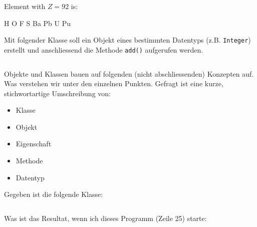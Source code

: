 \documentclass[12pt,a4paper]{exam}
\begin{document}
\begin{questions}
        {%
        \renewcommand*\thechoice{\arabic{choice}}
        \renewcommand*\choicelabel{\thechoice)}
        \question[2] Element with $Z=92$ is:
        \begin{multicols}{2}
            \begin{choices}
                \choice H
                \choice O
                \choice F
                \choice S
                \choice Ba
                \choice Pb
                \choice U
                \choice Pu
            \end{choices}
        \end{multicols}
        }%

        \question[10]
        Mit folgender Klasse soll ein Objekt eines bestimmten Datentyps (z.B.
        \texttt{Integer}) erstellt und anschliessend die Methode
        \texttt{add()} aufgerufen werden.
        \inputminted[autogobble,linenos,firstline=3]{java}{../java/generics/Cache.java}
        \makeemptybox{2in}

        \newpage
        \question[10]
        Objekte und Klassen bauen auf folgenden (nicht abschliessenden) Konzepten auf.
        Was verstehen wir unter den einzelnen Punkten. Gefragt ist eine kurze, stichwortartige
        Umschreibung von:
        \begin{itemize}
            \item Klasse
            \item Objekt
            \item Eigenschaft
            \item Methode
            \item Datentyp
        \end{itemize}
        \makeemptybox{\fill}

        \newpage\question[10]
        Gegeben ist die folgende Klasse:
        \inputminted[autogobble,linenos]{java}{../java/academy/calculator/InputValidator.java}

        Was ist das Resultat, wenn ich dieses Programm (Zeile 25) starte:
        \makeemptybox{\fill}

    \end{questions}
\end{document}
